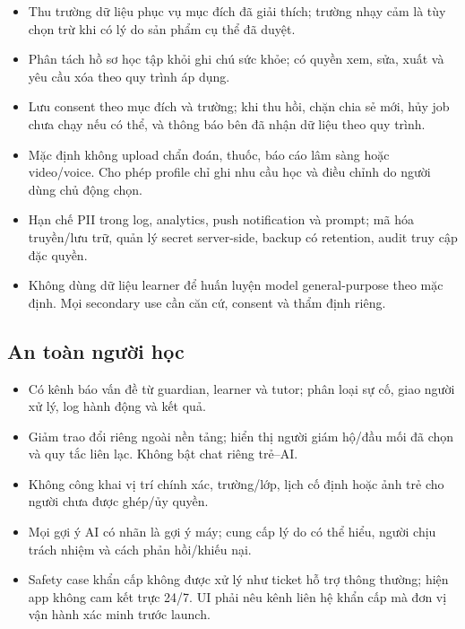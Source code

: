 \documentclass[11pt,a4paper]{article}
\begin{document}
\begin{itemize}
  \item Thu trường dữ liệu phục vụ mục đích đã giải thích; trường nhạy cảm là tùy chọn trừ khi có lý do sản phẩm cụ thể đã duyệt.
  \item Phân tách hồ sơ học tập khỏi ghi chú sức khỏe; có quyền xem, sửa, xuất và yêu cầu xóa theo quy trình áp dụng.
  \item Lưu consent theo mục đích và trường; khi thu hồi, chặn chia sẻ mới, hủy job chưa chạy nếu có thể, và thông báo bên đã nhận dữ liệu theo quy trình.
  \item Mặc định không upload chẩn đoán, thuốc, báo cáo lâm sàng hoặc video/voice. Cho phép profile chỉ ghi nhu cầu học và điều chỉnh do người dùng chủ động chọn.
  \item Hạn chế PII trong log, analytics, push notification và prompt; mã hóa truyền/lưu trữ, quản lý secret server-side, backup có retention, audit truy cập đặc quyền.
  \item Không dùng dữ liệu learner để huấn luyện model general-purpose theo mặc định. Mọi secondary use cần căn cứ, consent và thẩm định riêng.
\end{itemize}

\subsection{An toàn người học}
\begin{itemize}
  \item Có kênh báo vấn đề từ guardian, learner và tutor; phân loại sự cố, giao người xử lý, log hành động và kết quả.
  \item Giảm trao đổi riêng ngoài nền tảng; hiển thị người giám hộ/đầu mối đã chọn và quy tắc liên lạc. Không bật chat riêng trẻ--AI.
  \item Không công khai vị trí chính xác, trường/lớp, lịch cố định hoặc ảnh trẻ cho người chưa được ghép/ủy quyền.
  \item Mọi gợi ý AI có nhãn là gợi ý máy; cung cấp lý do có thể hiểu, người chịu trách nhiệm và cách phản hồi/khiếu nại.
  \item Safety case khẩn cấp không được xử lý như ticket hỗ trợ thông thường; hiện app không cam kết trực 24/7. UI phải nêu kênh liên hệ khẩn cấp mà đơn vị vận hành xác minh trước launch.
\end{itemize}
\end{document}
